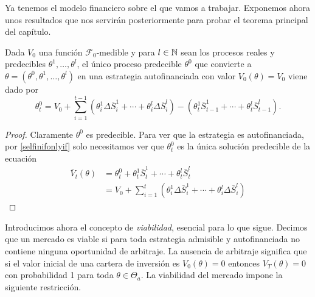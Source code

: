 Ya tenemos el modelo financiero sobre el que vamos a trabajar. Exponemos ahora unos resultados que nos servirán posteriormente para probar el teorema principal del capítulo.
\bigskip
\begin{lemaBox}\label{2.2.1}
	Dada $ V_0 $ una función $ \mathcal{F}_0 $-medible y para $ l \in \mathbb{N}  $ sean los procesos reales y predecibles $ \theta^1,\dots,\theta^l $, el único proceso predecible $ \theta^0 $ que convierte a $ \theta = (\theta^0,\theta^1,\dots,\theta^l) $ en una estrategia autofinanciada con valor $ V_0 (\theta)= V_0 $ viene dado por
	\[
	\theta^0_t = V_0 + \sum_{i=1}^{t-1}(\theta^1_i\Delta\bar{S}^1_i+\cdots+\theta^l_i\Delta\bar{S}^l_i) - (\theta^1_t\bar{S}^1_{t-1}+\cdots+\theta^l_t\bar{S}^l_{t-1}).
	\]
\end{lemaBox}
\begin{proof}
	Claramente $ \theta^0 $ es predecible. Para ver que la estrategia es autofinanciada, por \eqref{selfinifonlyif} solo necesitamos ver que $ \theta^0_t $ es la única solución predecible de la ecuación 
	\begin{equation*}
	\begin{split}
	\bar{V}_t(\theta) &= \theta^0_t + \theta^1_t\bar{S}^1_t+\cdots+\theta^l_t\bar{S}^l_t \\
	&= V_0 + \sum_{i=1}^{t}(\theta^1_i\Delta\bar{S}^1_i+\cdots+\theta^l_i\Delta\bar{S}^l_i)
	\end{split}
	\end{equation*}
\end{proof}
\bigskip
Introducimos ahora el concepto de \textit{viabilidad}, esencial para lo que sigue. Decimos que un mercado es viable si para toda estrategia admisible y autofinanciada no contiene ninguna oportunidad de arbitraje. La ausencia de arbitraje significa que si el valor inicial de una cartera de inversión es $ V_0(\theta) = 0 $ entonces $ V_T(\theta) = 0 $ con probabilidad 1 para toda $ \theta \in\Theta_a $. La viabilidad del mercado impone la siguiente restricción.


